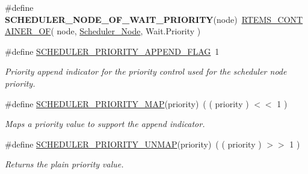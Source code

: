 \begin{DoxyCompactItemize}
\item 
\mbox{\label{group__RTEMSScoreScheduler_ga4c894cd67a2212bc89530144215c268f}} 
\#define {\bfseries S\+C\+H\+E\+D\+U\+L\+E\+R\+\_\+\+N\+O\+D\+E\+\_\+\+O\+F\+\_\+\+W\+A\+I\+T\+\_\+\+P\+R\+I\+O\+R\+I\+TY}(node)~\mbox{\hyperlink{group__RTEMSScoreBaseDefs_gab2e7a0141fd898ae358fa9b134aa2610}{R\+T\+E\+M\+S\+\_\+\+C\+O\+N\+T\+A\+I\+N\+E\+R\+\_\+\+OF}}( node, \mbox{\hyperlink{structScheduler__Node}{Scheduler\+\_\+\+Node}}, Wait.\+Priority )
\item 
\mbox{\label{group__RTEMSScoreScheduler_ga4f92274867a1bb479fd308b47235c202}} 
\#define \mbox{\hyperlink{group__RTEMSScoreScheduler_ga4f92274867a1bb479fd308b47235c202}{S\+C\+H\+E\+D\+U\+L\+E\+R\+\_\+\+P\+R\+I\+O\+R\+I\+T\+Y\+\_\+\+A\+P\+P\+E\+N\+D\+\_\+\+F\+L\+AG}}~1
\begin{DoxyCompactList}\small\item\em Priority append indicator for the priority control used for the scheduler node priority. \end{DoxyCompactList}\item 
\mbox{\label{group__RTEMSScoreScheduler_gabfbb467344bb96c6bbc1b5afe3442655}} 
\#define \mbox{\hyperlink{group__RTEMSScoreScheduler_gabfbb467344bb96c6bbc1b5afe3442655}{S\+C\+H\+E\+D\+U\+L\+E\+R\+\_\+\+P\+R\+I\+O\+R\+I\+T\+Y\+\_\+\+M\+AP}}(priority)~( ( priority ) $<$$<$ 1 )
\begin{DoxyCompactList}\small\item\em Maps a priority value to support the append indicator. \end{DoxyCompactList}\item 
\mbox{\label{group__RTEMSScoreScheduler_gaa878c63b883116f813b814c90f8af849}} 
\#define \mbox{\hyperlink{group__RTEMSScoreScheduler_gaa878c63b883116f813b814c90f8af849}{S\+C\+H\+E\+D\+U\+L\+E\+R\+\_\+\+P\+R\+I\+O\+R\+I\+T\+Y\+\_\+\+U\+N\+M\+AP}}(priority)~( ( priority ) $>$$>$ 1 )
\begin{DoxyCompactList}\small\item\em Returns the plain priority value. \end{DoxyCompactList}\item 
\mbox{\label{group__RTEMSScoreScheduler_ga8e11bd14b7c5a2f713b9864aea7bd786}} 

\end{DoxyCompactItemize}
